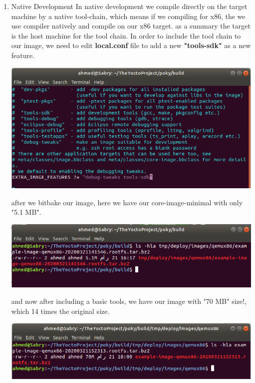 \documentclass{article}
\begin{document}
\begin{enumerate}
  \item Native Development
  In native development we compile directly on the target machine by a native tool-chain, which means if we compiling for x86, the we use compiler natively and compile on our x86 target. as a summary the target is the host machine for the tool chain.
  In order to include the tool chain to our image, we need to edit \textbf{local.conf} file to add a new \textbf{"tools-sdk"} as a new feature.
  
  \begin{center}
    \includegraphics[scale=0.6]{./resources/img/adding-tools-sdk-to-coreminimal.png}
  \end{center}
  after we bitbake our image, here we have our core-image-minimal with only "5.1 MB".

  \begin{center}
    \includegraphics[scale=0.6]{./resources/img/core-minimal-size-without-sdk.png}
  \end{center}

  and now after including a basic tools, we have our image with "70 MB" size!, which 14 times the original size.
  \begin{center}
    \includegraphics[scale=0.6]{./resources/img/core-minimal-size-with-sdk.png}
  \end{center}


\end{enumerate}
\end{document}
